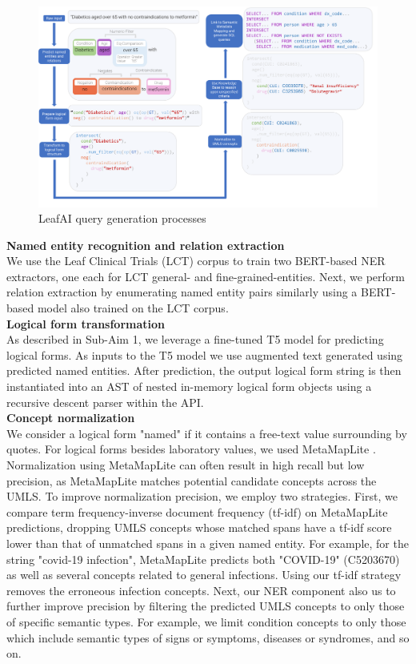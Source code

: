 \documentclass[../main.tex]{subfiles}
\begin{document}
\begin{figure}[h]
  \includegraphics[scale=0.52]{Figures/Aim2/aim2_leafai_flow.pdf}  
\caption{LeafAI query generation processes}
\label{aim2_fig_leafai_querygen}
\end{figure}

\noindent \textbf{Named entity recognition and relation extraction} \\
We use the Leaf Clinical Trials (LCT) corpus \cite{dobbins2022leaf} to train two BERT-based \cite{devlin2018bert} NER extractors, one each for LCT general- and fine-grained-entities. Next, we perform relation extraction by enumerating named entity pairs similarly using a BERT-based model also trained on the LCT corpus. \\

\noindent \textbf{Logical form transformation} \\
As described in Sub-Aim 1, we leverage a fine-tuned T5 model for predicting logical forms. As inputs to the T5 model we use augmented text generated using predicted named entities. After prediction, the output logical form string is then instantiated into an AST of nested in-memory logical form objects using a recursive descent parser within the API. \\

\noindent \textbf{Concept normalization} \\
We consider a logical form "named" if it contains a free-text value surrounding by quotes. For logical forms besides laboratory values, we used MetaMapLite \cite{aronson2001effective, demner2017metamap}. Normalization using MetaMapLite can often result in high recall but low precision, as MetaMapLite matches potential candidate concepts across the UMLS. To improve normalization precision, we employ two strategies. First, we compare term frequency-inverse document frequency (tf-idf) on MetaMapLite predictions, dropping UMLS concepts whose matched spans have a tf-idf score lower than that of unmatched spans in a given named entity. For example, for the string "covid-19 infection", MetaMapLite predicts both "COVID-19" (C5203670) as well as several concepts related to general infections. Using our tf-idf strategy removes the erroneous infection concepts. Next, our NER component also us to further improve precision by filtering the predicted UMLS concepts to only those of specific semantic types. For example, we limit condition concepts to only those which include semantic types of signs or symptoms, diseases or syndromes, and so on. 
\end{document}
